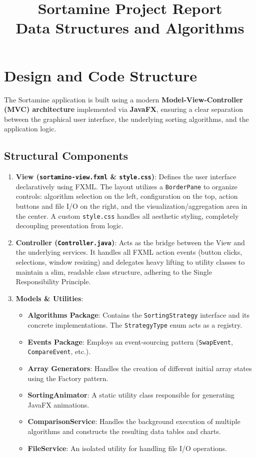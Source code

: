 \documentclass[11pt,a4paper]{article}
\title{\vspace{-2cm}\textbf{Sortamine Project Report}\\ \large Data Structures and Algorithms}
\author{}
\date{\vspace{-1cm}}
\begin{document}
\maketitle
\vspace{-1cm}

\section{Design and Code Structure}

The Sortamine application is built using a modern \textbf{Model-View-Controller (MVC) architecture} implemented via \textbf{JavaFX}, ensuring a clear separation between the graphical user interface, the underlying sorting algorithms, and the application logic.

\subsection*{Structural Components}
\begin{enumerate}[label=\arabic*., itemsep=0.2em]
    \item \textbf{View (\texttt{sortamino-view.fxml} \& \texttt{style.css})}: Defines the user interface declaratively using FXML. The layout utilizes a \texttt{BorderPane} to organize controls: algorithm selection on the left, configuration on the top, action buttons and file I/O on the right, and the visualization/aggregation area in the center. A custom \texttt{style.css} handles all aesthetic styling, completely decoupling presentation from logic.
    \item \textbf{Controller (\texttt{Controller.java})}: Acts as the bridge between the View and the underlying services. It handles all FXML action events (button clicks, selections, window resizing) and delegates heavy lifting to utility classes to maintain a slim, readable class structure, adhering to the Single Responsibility Principle.
    \item \textbf{Models \& Utilities}:
    \begin{itemize}[itemsep=0.1em]
        \item \textbf{Algorithms Package}: Contains the \texttt{SortingStrategy} interface and its concrete implementations. The \texttt{StrategyType} enum acts as a registry.
        \item \textbf{Events Package}: Employs an event-sourcing pattern (\texttt{SwapEvent}, \texttt{CompareEvent}, etc.).
        \item \textbf{Array Generators}: Handles the creation of different initial array states using the Factory pattern.
        \item \textbf{SortingAnimator}: A static utility class responsible for generating JavaFX animations.
        \item \textbf{ComparisonService}: Handles the background execution of multiple algorithms and constructs the resulting data tables and charts.
        \item \textbf{FileService}: An isolated utility for handling file I/O operations.
    \end{itemize}
\end{enumerate}
\end{document}
